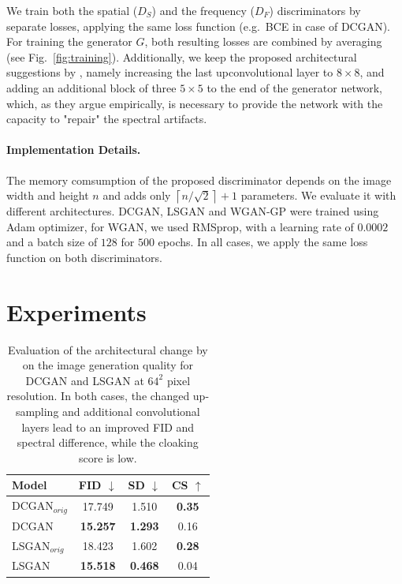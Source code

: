 \documentclass[letterpaper]{article} %
\begin{document}
We train both the spatial ($D_S$) and the frequency ($D_F$) discriminators by separate losses, applying the same loss function (e.g.~BCE in case of DCGAN). For training the generator $G$, both resulting losses are combined by averaging (see Fig.~\ref{fig:training}).
Additionally, we keep the proposed architectural suggestions by \cite{margret2020upconvolution}, namely increasing the last upconvolutional layer to $8 \times 8$, and adding an additional block of three $5 \times 5$ to the end of the generator network, which, as they argue empirically, is necessary to provide the network with the capacity to "repair" the spectral artifacts.
\paragraph{Implementation Details.}
The memory comsumption of the proposed discriminator depends on the image width and height $n$ and adds only  $\left\lceil n/\sqrt{2} \right\rceil + 1$ parameters. We evaluate it with different architectures.
DCGAN, LSGAN and WGAN-GP were trained using Adam optimizer, for WGAN, we used RMSprop, with a learning rate of $0.0002$ and a batch size of $128$ for $500$ epochs. In all cases, we apply the same loss function on both discriminators.



\section{Experiments}
\label{sec:experiments}
\begin{table}
    \caption{Evaluation of the architectural change by \citet{margret2020upconvolution} on the image generation quality for DCGAN and LSGAN at $64^2$ pixel resolution. In both cases, the changed up-sampling and additional convolutional layers lead to an improved FID and spectral difference, while the cloaking score is low.}
    \centering
    \begin{tabular}{l c c c}
        \toprule
         Model & FID $\downarrow$ & SD $\downarrow$ & CS $\uparrow$ \\
        \midrule
DCGAN$_{orig}$ & 17.749 & 1.510 & {\bf 0.35} \\
DCGAN &{\bf 15.257} &{\bf 1.293} & 0.16\\
LSGAN$_{orig}$&18.423&1.602&{\bf 0.28}\\
LSGAN& {\bf 15.518} & {\bf 0.468} & 0.04\\
\bottomrule
    \end{tabular}
    \label{tab:taborig}
\end{table}
\end{document}
